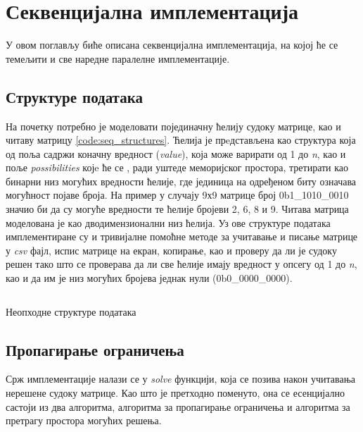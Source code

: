 \section{Секвенцијална имплементација}\label{sec:sequential}
У овом поглављу биће описана секвенцијална имплементација, на којој ће се темељити и све наредне паралелне имплементације.

\subsection{Структуре података}

На почетку потребно је моделовати појединачну ћелију судоку матрице, као и читаву матрицу \ref{code:seq_structures}. Ћелија је прeдстављена као структура која од поља садржи коначну вредност (\textit{value}), која може варирати од 1 до \textit{n}, као и поље \textit{possibilities} којe ће се , ради уштеде меморијског простора, третирати као бинарни низ могућих вредности ћелије, где јединица на одређеном биту означава могућност појаве броја. На пример у случају 9х9 матрице број 0b1\_1010\_0010 значио би да су могуће вредности те ћелије бројеви 2, 6, 8 и 9. Читава матрица моделована је као дводимензионални низ ћелија. Уз ове структуре података имплементиране су и тривијалне помоћне методе за учитавање и писање матрице у \textit{csv} фајл, испис матрице на екран, копирање, као и проверу да ли је судоку решен тако што се проверава да ли све ћелије имају вредност у опсегу од 1 до \textit{n}, као и да им је низ могућих бројева једнак нули (0b0\_0000\_0000).

\begin{listing}[H]
\inputminted{c}{kodovi/seq_structures.c}
\caption{Неопходне структуре података}
\label{code:seq_structures}
\end{listing}

\subsection{Пропагирање ограничења}\label{constraint_prop}

Срж имплементације налази се у  \textit{solve} функцији, која се позива након учитавања нерешене судоку матрице. Као што је претходно поменуто, она се есенцијално састоји из два алгоритма, алгоритма за пропагирање   ограничења и алгоритма за претрагу простора могућих решења.\\

